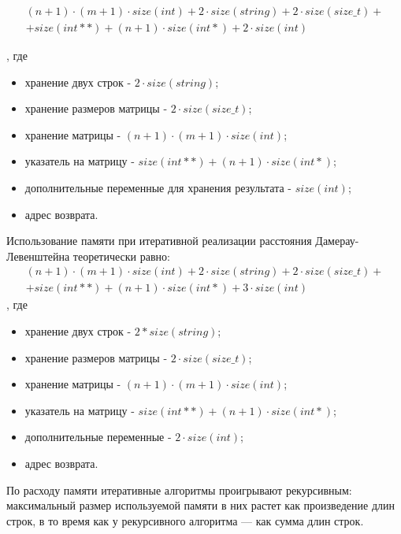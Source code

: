 \begin{equation}
	\begin{aligned}
		(n + 1) \cdot (m + 1) \cdot size(int) + 2 \cdot size(string) + 2 \cdot size(size\_t) + \\
		+ size(int **) + (n + 1) \cdot size(int *) + 2 \cdot size(int)
	\end{aligned}
\end{equation}

, где 
\begin{itemize}
	\item хранение двух строк - $2 \cdot size(string)$;
	\item хранение размеров матрицы - $2 \cdot size(size\_t)$;
	\item хранение матрицы - $(n + 1) \cdot (m + 1) \cdot size(int)$;
	\item указатель на матрицу - $size(int **) + (n + 1) \cdot size(int *)$;
	\item дополнительные переменные для хранения результата - $size(int)$;
	\item адрес возврата.
\end{itemize}


Использование памяти при итеративной реализации расстояния Дамерау-Левенштейна теоретически равно:
\begin{equation}
	\begin{aligned}
		(n + 1) \cdot (m + 1) \cdot size(int) + 2 \cdot size(string) + 2 \cdot size(size\_t) + \\
		+ size(int **) + (n + 1) \cdot size(int *) + 3 \cdot size(int)
	\end{aligned}
\end{equation}
, где 
\begin{itemize}
	\item хранение двух строк - $2 * size(string)$;
	\item хранение размеров матрицы - $2 \cdot size(size\_t)$;
	\item хранение матрицы - $(n + 1) \cdot (m + 1) \cdot size(int)$;
	\item указатель на матрицу - $size(int **) + (n + 1) \cdot size(int *)$;
	\item дополнительные переменные - $2 \cdot size(int)$;
	\item адрес возврата.
\end{itemize}

По расходу памяти итеративные алгоритмы проигрывают рекурсивным: максимальный размер используемой памяти в них растет как произведение длин строк, в то время как у рекурсивного алгоритма — как сумма длин строк.

